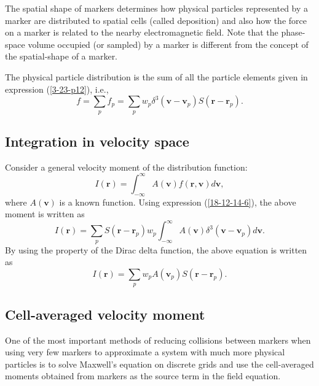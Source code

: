 \documentclass{article}
\begin{document}
The spatial shape of markers determines how physical particles represented by
a marker are distributed to spatial cells (called deposition) and also how the
force on a marker is related to the nearby electromagnetic field. Note that
the phase-space volume occupied (or sampled) by a marker is different from the
concept of the spatial-shape of a marker.

The physical particle distribution is the sum of all the particle elements
given in expression (\ref{3-23-p12}), i.e.,
\begin{equation}
  \label{18-12-14-6} f = \sum_p f_p = \sum_p w_p \delta^3
  (\mathbf{v}-\mathbf{v}_p) S (\mathbf{r}-\mathbf{r}_p) .
\end{equation}

\subsection{Integration in velocity space}

Consider a general velocity moment of the distribution function:
\begin{equation}
  I (\mathbf{r}) = \int_{- \infty}^{\infty} A (\mathbf{v}) f (\mathbf{r},
  \mathbf{v}) d\mathbf{v},
\end{equation}
where $A (\mathbf{v})$ is a known function. Using expression
(\ref{18-12-14-6}), the above moment is written as
\begin{equation}
  I (\mathbf{r}) = \sum_p S (\mathbf{r}-\mathbf{r}_p) w_p \int_{-
  \infty}^{\infty} A (\mathbf{v}) \delta^3 (\mathbf{v}-\mathbf{v}_p)
  d\mathbf{v}.
\end{equation}
By using the property of the Dirac delta function, the above equation is
written as
\begin{equation}
  \label{3-23-p10} I (\mathbf{r}) = \sum_p w_p A (\mathbf{v}_p) S
  (\mathbf{r}-\mathbf{r}_p) .
\end{equation}

\subsection{Cell-averaged velocity moment}

One of the most important methods of reducing collisions between markers when
using very few markers to approximate a system with much more physical
particles is to solve Maxwell's equation on discrete grids and use the
cell-averaged moments obtained from markers as the source term in the field
equation.
\end{document}
